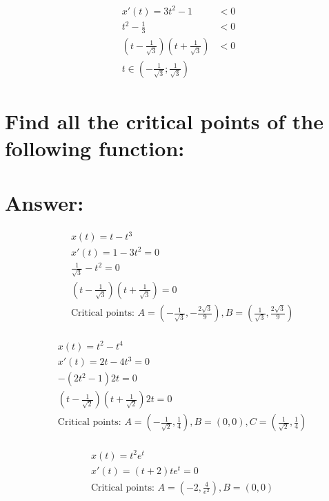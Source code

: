 \documentclass{article}
\begin{document}
\begin{equation}
\begin{split}
x'(t) = 3t^2 - 1 & < 0 \\
t^2 - \frac{1}{3} & < 0 \\
(t - \frac{1}{\sqrt{3}})(t + \frac{1}{\sqrt{3}}) & < 0 \\
t \in (-\frac{1}{\sqrt{3}};\frac{1}{\sqrt{3}}) &
\end{split}
\end{equation}

\section{\normalfont Find all the critical points of the following function:}

\section*{Answer:}

\begin{equation}
\begin{split}
& x(t) = t - t^3 \\
& x'(t) =  1 - 3t^2 = 0 \\
& \frac{1}{\sqrt{3}} - t^2 = 0 \\
& (t - \frac{1}{\sqrt{3}})(t + \frac{1}{\sqrt{3}}) = 0 \\
& \text{Critical points: } A = (-\frac{1}{\sqrt{3}},-\frac{2\sqrt{3}}{9}), B = (\frac{1}{\sqrt{3}},\frac{2\sqrt{3}}{9}) \\
\end{split}
\end{equation}

\begin{equation}
\begin{split}
& x(t) = t^2 - t^4\\
& x'(t) = 2t - 4t^3 = 0 \\
& -(2t^2 - 1)2t = 0 \\
& (t - \frac{1}{\sqrt{2}})(t + \frac{1}{\sqrt{2}})2t = 0 \\
& \text{Critical points: } A = (-\frac{1}{\sqrt{2}},\frac{1}{4}), B = (0, 0), C = (\frac{1}{\sqrt{2}},\frac{1}{4}) \\
\end{split}
\end{equation}

\begin{equation}
\begin{split}
& x(t) = t^2e^t \\
& x'(t) = (t + 2)te^t = 0 \\
& \text{Critical points: } A = (-2,\frac{4}{e^2}), B = (0, 0)\\
\end{split}
\end{equation}
\end{document}
